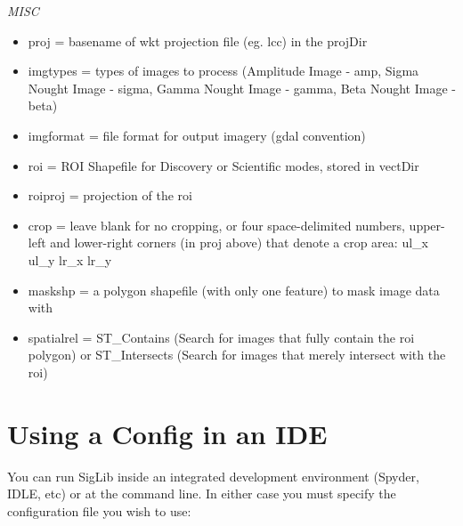 \documentclass[letterpaper,10pt,openany,oneside]{sphinxmanual}
\begin{document}
\emph{MISC}
\begin{itemize}
\item {} 
proj = basename of wkt projection file (eg. lcc) in the projDir

\item {} 
imgtypes = types of images to process (Amplitude Image - amp, Sigma
Nought Image - sigma, Gamma Nought Image - gamma, Beta Nought
Image - beta)

\item {} 
imgformat = file format for output imagery (gdal convention)

\item {} 
roi = ROI Shapefile for Discovery or Scientific modes, stored in vectDir

\item {} 
roiproj = projection of the roi

\item {} 
crop = leave blank for no cropping, or four space-delimited numbers,
upper-left and lower-right corners (in proj above) that denote a crop
area: ul\_x ul\_y lr\_x lr\_y

\item {} 
maskshp = a polygon shapefile (with only one feature) to mask image data with

\item {} 
spatialrel = ST\_Contains (Search for images that fully contain the
roi polygon) or ST\_Intersects (Search for images that merely
intersect with the roi)

\end{itemize}


\section{Using a Config in an IDE}
\label{project:using-a-config-in-an-ide}
You can run SigLib inside an integrated development environment (Spyder,
IDLE, etc) or at the command line. In either case you must specify the
configuration file you wish to use:

\end{document}
